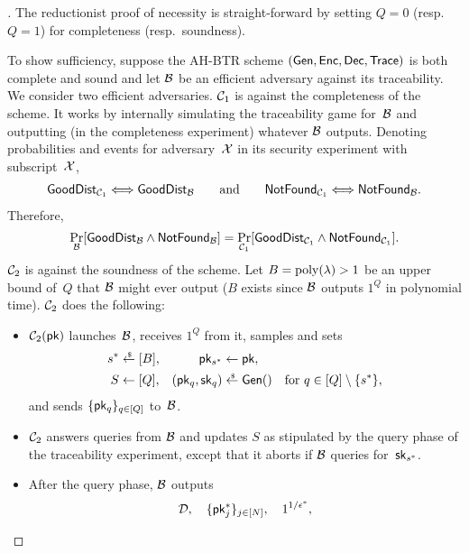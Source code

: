 \begin{proof}[]
The reductionist proof of necessity is straight-forward by setting ${Q=0}$ (resp.~${Q=1}$) for completeness (resp.~soundness).

To show sufficiency, suppose the AH-BTR scheme $(\Gen,\Enc,\Dec,\Trace)$ is both complete and sound and let ${\mathcal{B}}$ be an efficient adversary against its traceability.
We consider two efficient adversaries.
${\mathcal{C}}_1$ is against the completeness of the scheme.
It works by internally simulating the traceability game for~${\mathcal{B}}$ and outputting (in the completeness experiment) whatever ${\mathcal{B}}$ outputs.
Denoting probabilities and events for adversary~${\mathcal{X}}$ in its security experiment with subscript~${\mathcal{X}}$,
\begin{align*}
\GoodDist_{\scriptC_1}
\Longleftrightarrow
\GoodDist_\scriptB
\qquad\textup{and}\qquad
\NotFound_{\scriptC_1}
\Longleftrightarrow
\NotFound_\scriptB.
\end{align*}
Therefore,
\begin{align*}
\Pr_\scriptB[\GoodDist_\scriptB\wedge\NotFound_\scriptB]
=
\Pr_{\scriptC_1}
[\GoodDist_{\scriptC_1}\wedge\NotFound_{\scriptC_1}].
\end{align*}
${\mathcal{C}}_2$ is against the soundness of the scheme.
Let ${B=\operatorname{poly}(\lambda)>1}$ be an upper bound of~$Q$ that ${\mathcal{B}}$ might ever output ($B$ exists since ${\mathcal{B}}$ outputs $1^Q$ in polynomial time).
${\mathcal{C}}_2$ does the following:
\begin{itemize}
\item $\scriptC_2(\pk)$ launches~${\mathcal{B}}$, receives $1^Q$ from it,
samples and sets
\begin{align*}
s^\ast&{}\draws[B],&
\pk_{s^\ast}&{}\gets\pk,\\
S&{}\gets[Q],&
(\pk_q,\sk_q)&{}\draws\Gen()\quad\textup{for }q\in{[Q]\setminus{\{s^\ast\}}},
\end{align*}
and sends $\{\pk_q\}_{q\in[Q]}$ to~${\mathcal{B}}$.
\item ${\mathcal{C}}_2$ answers queries from ${\mathcal{B}}$ and updates $S$ as stipulated by the query phase of the traceability experiment, except that it aborts if ${\mathcal{B}}$ queries for~$\sk_{s^\ast}$.
\item After the query phase, ${\mathcal{B}}$ outputs
\begin{align*}
\scriptD,\quad
\{\pk_j^\ast\}_{j\in[N]},\quad
1^{1/\epsilon^\ast},
\end{align*}

\end{itemize}
\end{proof}
